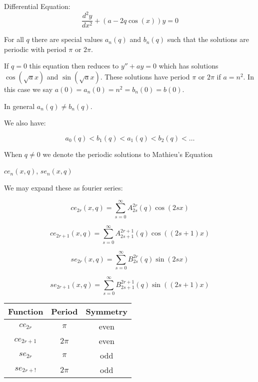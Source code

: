 \documentclass{article}
\begin{document}
Differential Equation:
\begin{equation}
    \frac{d^2y}{dx^2} + (a - 2q\cos(x))y = 0
\end{equation}

For all $q$ there are special values $a_n(q)$ and $b_n(q)$ such that the solutions are periodic with period $\pi$ or $2\pi$.

If $q=0$ this equation then reduces to $y'' + ay = 0$ which has solutions $\cos(\sqrt{a}x)$ and $\sin(\sqrt{a}x)$. These solutions have period $\pi$ or $2\pi$ if $a = n^2$. In this case we say $a(0) = a_n(0) = n^2 = b_n(0)=b(0)$. 

In general $a_n(q) \neq b_n(q)$.

We also have:

\begin{equation}
    a_0(q) < b_1(q) < a_1(q) < b_2(q) < \dots
\end{equation}

When $q \neq 0$ we denote the periodic solutions to Mathieu's Equation
\begin{center}
    $ce_n(x, q)$, $se_n(x, q)$   
\end{center}

We may expand these as fourier series:

\begin{equation}
    ce_{2r}(x, q) = \sum_{s=0}^{\infty}{A_{2s}^{2r}(q)\cos(2sx)}
\end{equation}

\begin{equation}
    ce_{2r+1}(x, q) = \sum_{s=0}^{\infty}{A_{2s+1}^{2r+1}(q)\cos((2s+1)x)}
\end{equation}

\begin{equation}
    se_{2r}(x, q) = \sum_{s=0}^{\infty}{B_{2s}^{2r}(q)\sin(2sx)}
\end{equation}

\begin{equation}
    se_{2r+1}(x, q) = \sum_{s=0}^{\infty}{B_{2s+1}^{2r+1}(q)\sin((2s+1)x)}
\end{equation}

\begin{center}
    \begin{tabular}{|c|c|c|}
    \hline
    Function & Period & Symmetry \\ \hline
    $ce_{2r}$ & $\pi$ & even \\ \hline
    $ce_{2r+1}$ & $2\pi$ & even \\ \hline
    $se_{2r}$ & $\pi$ & odd \\ \hline
    $se_{2r+!}$ & $2\pi$ & odd \\ \hline
    \end{tabular}
\end{center}
\end{document}
